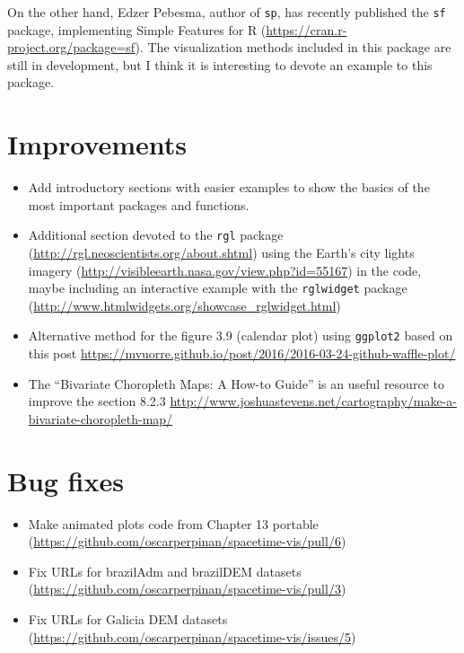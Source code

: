 \documentclass[11pt]{article}
\begin{document}
On the other hand, Edzer Pebesma, author of \texttt{sp}, has recently published the \texttt{sf} package, implementing Simple Features for R (\url{https://cran.r-project.org/package=sf}). The visualization methods included in this package are still in development, but I think it is interesting to devote an example to this package.

\section{Improvements}
\label{sec:org813ed42}
\begin{itemize}
\item Add introductory sections with easier examples to show the basics of the most important packages and functions.

\item Additional section devoted to the \texttt{rgl} package (\url{http://rgl.neoscientists.org/about.shtml}) using the Earth's city lights imagery (\url{http://visibleearth.nasa.gov/view.php?id=55167}) in the code, maybe including an interactive example with the \texttt{rglwidget} package (\url{http://www.htmlwidgets.org/showcase\_rglwidget.html})

\item Alternative method for the figure 3.9 (calendar plot) using \texttt{ggplot2} based on this post \url{https://mvuorre.github.io/post/2016/2016-03-24-github-waffle-plot/}

\item The ``Bivariate Choropleth Maps: A How-to Guide'' is an useful resource to improve the section 8.2.3 \url{http://www.joshuastevens.net/cartography/make-a-bivariate-choropleth-map/}
\end{itemize}

\section{Bug fixes}
\label{sec:org64692db}

\begin{itemize}
\item Make animated plots code from Chapter 13 portable (\url{https://github.com/oscarperpinan/spacetime-vis/pull/6})
\item Fix URLs for brazilAdm and brazilDEM datasets (\url{https://github.com/oscarperpinan/spacetime-vis/pull/3})
\item Fix URLs for Galicia DEM datasets (\url{https://github.com/oscarperpinan/spacetime-vis/issues/5})
\end{itemize}
\end{document}
